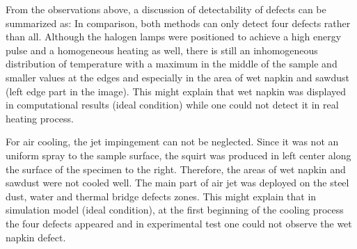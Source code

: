 \documentclass{tQRT2e}
\begin{document}
From the observations above, a discussion of detectability of defects can be summarized as:
In comparison, both methods can only detect four defects rather than all. Although the halogen lamps were positioned to achieve a high energy pulse and a homogeneous heating as well, there is still an inhomogeneous distribution of temperature with a maximum in the middle of the sample and smaller values at the edges and especially in the area of wet napkin and sawdust (left edge part in the image). This might explain that wet napkin was displayed in computational results (ideal condition) while one could not detect it in real heating process. 

For air cooling, the jet impingement can not be neglected. Since it was not an uniform spray to the sample surface, the squirt was produced in left center along the surface of the specimen to the right. Therefore, the areas of wet napkin and sawdust were not cooled well. The main part of air jet was deployed on the steel dust, water and thermal bridge defects zones. This might explain that in simulation model (ideal condition), at the first beginning of the cooling process the four defects appeared and in experimental test one could not observe the wet napkin defect.
\end{document}
